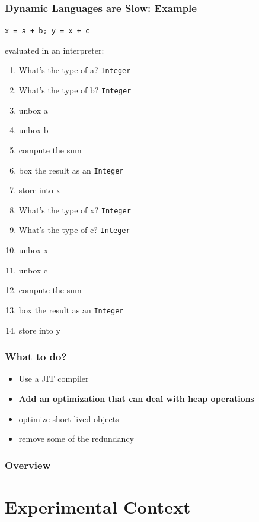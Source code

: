 \documentclass[utf8x]{beamer}
\begin{document}
\begin{frame}
  \frametitle{Dynamic Languages are Slow: Example}
  \texttt{x = a + b; y = x + c}

  evaluated in an interpreter:
  \pause
  \begin{enumerate}
      \item What's the type of a? \texttt{Integer}
      \item What's the type of b? \texttt{Integer}
  \pause
      \item unbox a
      \item unbox b
      \item compute the sum
  \pause
      \item box the result as an \texttt{Integer}
      \item store into x
  \pause
      \item What's the type of x? \texttt{Integer}
      \item What's the type of c? \texttt{Integer}
  \pause
      \item unbox x
      \item unbox c
      \item compute the sum
  \pause
      \item box the result as an \texttt{Integer}
      \item store into y
  \end{enumerate}
\end{frame}

\begin{frame}
  \frametitle{What to do?}
  \begin{itemize}
      \item Use a JIT compiler
      \item \textbf{Add an optimization that can deal with heap operations}
      \pause
      \item optimize short-lived objects
      \item remove some of the redundancy
  \end{itemize}
\end{frame}

\begin{frame}
  \frametitle{Overview}
  \tableofcontents
\end{frame}

\section{Experimental Context}
\end{document}
